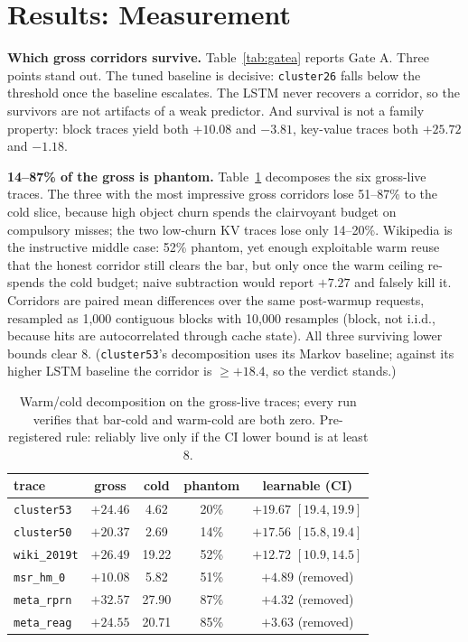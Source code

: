 \documentclass[letterpaper]{article} %
\begin{document}
\section{Results: Measurement}
\textbf{Which gross corridors survive.} Table~\ref{tab:gatea} reports Gate A. Three points stand out. The tuned baseline is decisive: \texttt{cluster26} falls below the threshold once the baseline escalates. The LSTM never recovers a corridor, so the survivors are not artifacts of a weak predictor. And survival is not a family property: block traces yield both $+10.08$ and $-3.81$, key-value traces both $+25.72$ and $-1.18$.

\textbf{14--87\% of the gross is phantom.} Table~\ref{tab:learnable} decomposes the six gross-live traces. The three with the most impressive gross corridors lose 51--87\% to the cold slice, because high object churn spends the clairvoyant budget on compulsory misses; the two low-churn KV traces lose only 14--20\%. Wikipedia is the instructive middle case: 52\% phantom, yet enough exploitable warm reuse that the honest corridor still clears the bar, but only once the warm ceiling re-spends the cold budget; naive subtraction would report $+7.27$ and falsely kill it. Corridors are paired mean differences over the same post-warmup requests, resampled as 1{,}000 contiguous blocks with 10{,}000 resamples (block, not i.i.d., because hits are autocorrelated through cache state). All three surviving lower bounds clear 8. (\texttt{cluster53}'s decomposition uses its Markov baseline; against its higher LSTM baseline the corridor is $\ge +18.4$, so the verdict stands.)

\begin{table}[t]
\centering\footnotesize
\setlength{\tabcolsep}{2pt}
\begin{tabular}{lcccc}
\toprule
trace & gross & cold & phantom & \textbf{learnable} (CI) \\
\midrule
\texttt{cluster53} & $+24.46$ & 4.62 & 20\% & $\mathbf{+19.67}$ $[19.4,19.9]$ \\
\texttt{cluster50} & $+20.37$ & 2.69 & 14\% & $\mathbf{+17.56}$ $[15.8,19.4]$ \\
\texttt{wiki\_2019t} & $+26.49$ & 19.22 & 52\% & $\mathbf{+12.72}$ $[10.9,14.5]$ \\
\texttt{msr\_hm\_0} & $+10.08$ & 5.82 & 51\% & $+4.89$ (removed) \\
\texttt{meta\_rprn} & $+32.57$ & 27.90 & 87\% & $+4.32$ (removed) \\
\texttt{meta\_reag} & $+24.55$ & 20.71 & 85\% & $+3.63$ (removed) \\
\bottomrule
\end{tabular}
\caption{Warm/cold decomposition on the gross-live traces; every run verifies that bar-cold and warm-cold are both zero. Pre-registered rule: reliably live only if the CI lower bound is at least 8.}
\label{tab:learnable}
\end{table}
\end{document}
